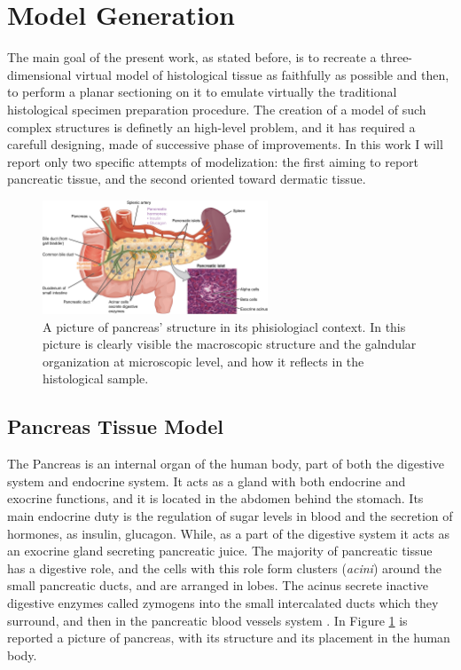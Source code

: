 \section{Model Generation}
The main goal of the present work, as stated before, is to recreate a three-dimensional virtual model of histological tissue as faithfully as possible and then, to perform a planar sectioning on it to emulate virtually the traditional histological specimen preparation procedure. The creation of a model of such complex structures is definetly an high-level problem, and it has required a carefull designing, made of successive phase of improvements. In this work I will report only two specific attempts of modelization: the first aiming to report pancreatic tissue, and the second oriented toward dermatic tissue.

\begin{figure}[b!]
    \centering
    \includegraphics[width = 0.6\textwidth]{images/panc_struct}
    \caption{A picture of pancreas' structure in its phisiologiacl context. In this picture is clearly visible the macroscopic structure and the galndular organization at microscopic level, and how it reflects in the histological sample.}
    \label{fig:panc_struct}
\end{figure}

\subsection{Pancreas Tissue Model} \label{ssec:panc_tis_mod}
The Pancreas is an internal organ of the human body, part of both the digestive system and endocrine system. It acts as a gland with both endocrine and exocrine functions, and it is located in the abdomen behind the stomach. Its main endocrine duty is the regulation of sugar levels in blood and the secretion of hormones, as insulin, glucagon. While, as a part of the digestive system it acts as an exocrine gland secreting pancreatic juice. The majority of pancreatic tissue has a digestive role, and the cells with this role form clusters (\textit{acini}) around the small pancreatic ducts, and are arranged in lobes. The acinus secrete inactive digestive enzymes called zymogens into the small intercalated ducts which they surround, and then in the pancreatic blood vessels system \cite{Pancreas}. In Figure \ref{fig:panc_struct} is reported a picture of pancreas, with its structure and its placement in the human body.

